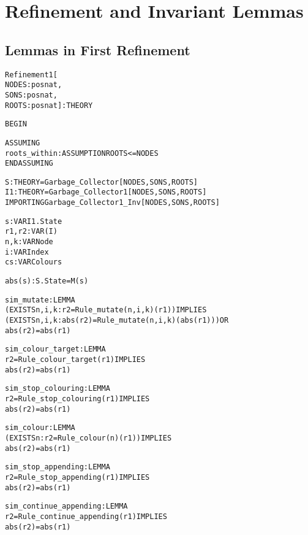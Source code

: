 
\newpage
\section{Refinement and Invariant Lemmas}
\subsection{Lemmas in First Refinement}

\begin{alltt}
%%%%%%%%%%%%%%%%%%%%%%%%%%%%%%%%%%%%%%%%%%%%%%%%%%%%%%%%%%%%%%%%
% Refinement1 :                                                %
%   Applies the ``Refinement'' theory to yield                 %
%   the first refinement lemma ``R1''. There is a              %
%   ``sim_xxx'' lemma for each concrete transition ``xxx'',    %
%   and these lemmas are used in proving the ``next_h'' lemma, %
%   which again is used in proving the TCC's generated by the  %
%   application of the ``Refinement'' theory.                  %
%%%%%%%%%%%%%%%%%%%%%%%%%%%%%%%%%%%%%%%%%%%%%%%%%%%%%%%%%%%%%%%%

Refinement1[
  NODES : posnat, 
  SONS  : posnat, 
  ROOTS : posnat] : THEORY

BEGIN

  ASSUMING
    roots_within : ASSUMPTION ROOTS <= NODES
  ENDASSUMING

  S  : THEORY = Garbage_Collector [NODES,SONS,ROOTS]
  I1 : THEORY = Garbage_Collector1[NODES,SONS,ROOTS]
  IMPORTING Garbage_Collector1_Inv[NODES,SONS,ROOTS]

  s     : VAR I1.State
  r1,r2 : VAR (I)
  n,k   : VAR Node
  i     : VAR Index
  cs    : VAR Colours

  abs(s):S.State = M(s)

  sim_mutate : LEMMA
    (EXISTS n,i,k: r2 = Rule_mutate(n,i,k)(r1)) IMPLIES
      (EXISTS n,i,k: abs(r2) = Rule_mutate(n,i,k)(abs(r1))) OR
      abs(r2) = abs(r1)

  sim_colour_target : LEMMA
    r2 = Rule_colour_target(r1) IMPLIES
      abs(r2) = abs(r1)

  sim_stop_colouring : LEMMA
    r2 = Rule_stop_colouring(r1) IMPLIES
      abs(r2) = abs(r1)

  sim_colour : LEMMA
    (EXISTS n: r2 = Rule_colour(n)(r1)) IMPLIES
      abs(r2) = abs(r1)

  sim_stop_appending : LEMMA
    r2 = Rule_stop_appending(r1) IMPLIES
      abs(r2) = abs(r1)

  sim_continue_appending : LEMMA
    r2 = Rule_continue_appending(r1) IMPLIES
      abs(r2) = abs(r1)


\end{alltt}
